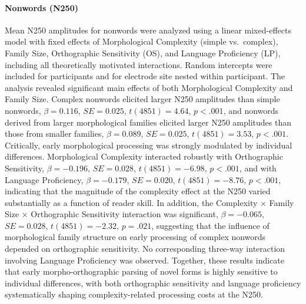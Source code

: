 \documentclass[preprint,12pt, authoryear, review]{elsarticle}
\begin{document}
	\paragraph*{Nonwords (N250)}
	Mean N250 amplitudes for nonwords were analyzed using a linear mixed-effects model with fixed effects of Morphological Complexity (simple vs.\ complex), Family Size, Orthographic Sensitivity (OS), and Language Proficiency (LP), including all theoretically motivated interactions. Random intercepts were included for participants and for electrode site nested within participant. The analysis revealed significant main effects of both Morphological Complexity and Family Size. Complex nonwords elicited larger N250 amplitudes than simple nonwords, $\beta = 0.116$, $SE = 0.025$, $t(4851) = 4.64$, $p < .001$, and nonwords derived from larger morphological families elicited larger N250 amplitudes than those from smaller families, $\beta = 0.089$, $SE = 0.025$, $t(4851) = 3.53$, $p < .001$. Critically, early morphological processing was strongly modulated by individual differences. Morphological Complexity interacted robustly with Orthographic Sensitivity, $\beta = -0.196$, $SE = 0.028$, $t(4851) = -6.98$, $p < .001$, and with Language Proficiency, $\beta = -0.179$, $SE = 0.020$, $t(4851) = -8.76$, $p < .001$, indicating that the magnitude of the complexity effect at the N250 varied substantially as a function of reader skill. In addition, the Complexity × Family Size × Orthographic Sensitivity interaction was significant, $\beta = -0.065$, $SE = 0.028$, $t(4851) = -2.32$, $p = .021$, suggesting that the influence of morphological family structure on early processing of complex nonwords depended on orthographic sensitivity. No corresponding three-way interaction involving Language Proficiency was observed. Together, these results indicate that early morpho-orthographic parsing of novel forms is highly sensitive to individual differences, with both orthographic sensitivity and language proficiency systematically shaping complexity-related processing costs at the N250.
			
\end{document}

